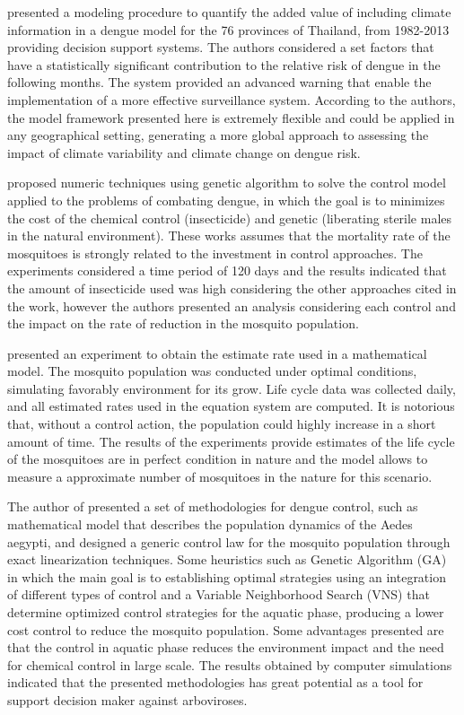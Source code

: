 \documentclass[a4paper,11pt]{article}
\begin{document}
\cite{lowe:2015} presented a  modeling procedure to quantify the  added value of
including  climate  information in  a  dengue  model  for  the 76  provinces  of
Thailand,  from  1982-2013  providing  decision  support  systems.  The  authors
considered a set  factors that have a statistically  significant contribution to
the relative  risk of  dengue in  the following months.  The system  provided an
advanced warning that enable the implementation of a more effective surveillance
system.  According  to  the  authors,  the model  framework  presented  here  is
extremely flexible and could be  applied in any geographical setting, generating
a  more global  approach  to assessing  the impact  of  climate variability  and
climate change on dengue risk.

\cite{bannwart-sbpo:2013,bannwart:2013}   proposed   numeric  techniques   using
genetic  algorithm  to solve  the  control  model  applied  to the  problems  of
combating dengue,  in which the  goal is to minimizes  the cost of  the chemical
control  (insecticide) and  genetic  (liberating sterile  males  in the  natural
environment). These works  assumes that the mortality rate of  the mosquitoes is
strongly  related  to the  investment  in  control approaches.  The  experiments
considered a time period  of 120 days and the results  indicated that the amount
of insecticide used was high considering the other approaches cited in the work,
however  the authors  presented an  analysis  considering each  control and  the
impact on the rate of reduction in the mosquito population.

\cite{cantane:2015} presented an experiment to  obtain the estimate rate used in
a  mathematical  model. The  mosquito  population  was conducted  under  optimal
conditions, simulating favorably  environment for its grow. Life  cycle data was
collected  daily, and  all  estimated  rates used  in  the  equation system  are
computed. It is  notorious that, without a control action,  the population could
highly  increase in  a short  amount  of time.  The results  of the  experiments
provide estimates of  the life cycle of the mosquitoes  are in perfect condition
in nature and the model allows to  measure a approximate number of mosquitoes in
the nature for this scenario.

The author of  \cite{dosreis:2018,florentino:2018,florentino-b:2018} presented a
set  of  methodologies for  dengue  control,  such  as mathematical  model  that
describes the population  dynamics of the Aedes aegypti, and  designed a generic
control law for the mosquito  population through exact linearization techniques.
Some heuristics  such as  Genetic Algorithm (GA)  in which the  main goal  is to
establishing  optimal strategies  using  an integration  of  different types  of
control  and  a Variable  Neighborhood  Search  (VNS) that  determine  optimized
control strategies  for the  aquatic phase,  producing a  lower cost  control to
reduce the mosquito  population. Some advantages presented are  that the control
in  aquatic phase  reduces  the environment  impact and  the  need for  chemical
control in large  scale. The results obtained by  computer simulations indicated
that  the presented  methodologies has  great potential  as a  tool for  support
decision maker against arboviroses.
\end{document}
